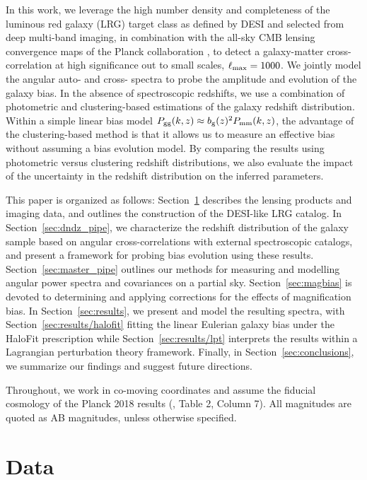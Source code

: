 \documentclass[a4paper,usenatbib]{mnras}
\begin{document}
In this work, we leverage the high number density and completeness of the luminous red galaxy (LRG) target class as defined by DESI and selected from deep multi-band imaging, in combination with the all-sky CMB lensing convergence maps of the Planck collaboration \citep{PlanckVIII}, to detect a galaxy-matter cross-correlation at high significance out to small scales, $\ell_{\rm max} = 1000$. We jointly model the angular auto- and cross- spectra to probe the amplitude and evolution of the galaxy bias. In the absence of spectroscopic redshifts, we use a combination of photometric and clustering-based estimations of the galaxy redshift distribution. Within a simple linear bias model $P_{\rm gg}(k,z) \approx b_{\rm g}(z)^2 P_{\rm mm}(k,z)$, the advantage of the clustering-based method is that it allows us to measure an effective bias without assuming a bias evolution model. By comparing the results using photometric versus clustering redshift distributions, we also evaluate the impact of the uncertainty in the redshift distribution on the inferred parameters.

This paper is organized as follows: Section~\ref{sec:data} describes the lensing products and imaging data, and outlines the construction of the DESI-like LRG catalog. In Section~\ref{sec:dndz_pipe}, we characterize the redshift distribution of the galaxy sample based on angular cross-correlations with external spectroscopic catalogs, and present a framework for probing bias evolution using these results. Section~\ref{sec:master_pipe} outlines our methods for measuring and modelling angular power spectra and covariances on a partial sky. Section~\ref{sec:magbias} is devoted to determining and applying corrections for the effects of magnification bias. In Section~\ref{sec:results}, we present and model the resulting spectra, with Section~\ref{sec:results/halofit} fitting the linear Eulerian galaxy bias under the HaloFit \citep{Smith++03} prescription while Section~\ref{sec:results/lpt} interprets the results within a Lagrangian perturbation theory framework. Finally, in Section~\ref{sec:conclusions}, we summarize our findings and suggest future directions. 

Throughout, we work in co-moving coordinates and assume the fiducial cosmology of the Planck 2018 results (\citealt{PlanckVI}, Table 2, Column 7). All magnitudes are quoted as AB magnitudes, unless otherwise specified.

\section{Data}\label{sec:data}
%
\end{document}
